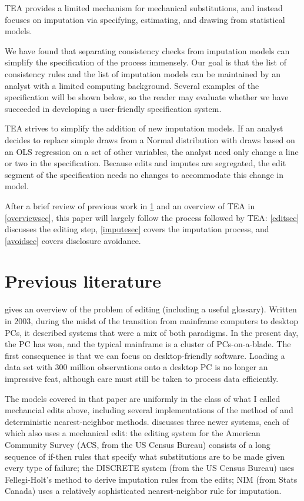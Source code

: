 \documentclass{article}
\begin{document}
TEA provides a limited mechanism for mechanical substitutions, and instead focuses on
imputation via specifying, estimating, and drawing from statistical models.

We have found that separating consistency checks from imputation models can simplify
the specification of the process immensely. Our goal is that the list of consistency
rules and the list of imputation models can be maintained by an analyst with a limited
computing background. Several examples of the specification will be shown below,
so the reader may evaluate whether we have succeeded in developing a user-friendly
specification system.

TEA strives to simplify the addition of new imputation models. If an analyst decides to
replace simple draws from a Normal distribution with draws based on an OLS regression on a
set of other variables, the analyst need only change a line or two in the specification.
Because edits and imputes are segregated, the edit segment of the specification needs no
changes to accommodate this change in model.


After a brief review of previous work in \ref{litsec} and an overview of TEA
in \ref{overviewsec}, this paper will largely follow the process followed by TEA:
\ref{editsec} discusses the editing step, \ref{imputesec} covers the imputation process,
and \ref{avoidsec} covers disclosure avoidance.

\section{Previous literature}\label{litsec}

\citet{edit:review} gives an overview of the problem of editing (including a useful
glossary). Written in 2003, during the midst of the transition from mainframe computers to
desktop PCs, it described systems that were a mix of both paradigms. In the present day, the PC
has won, and the typical mainframe is a cluster of PCs-on-a-blade. The first consequence
is that we can focus on desktop-friendly software. Loading a data set with 300 million observations
onto a desktop PC is no longer an impressive feat, although care must still be
taken to process data efficiently. 


The models covered in that paper are uniformly in the class of what I called mechancial
edits above, including several implementations of the method of \citet{fellegi:holt}
and deterministic nearest-neighbor methods.  \citet{chen:threesystems} discusses three
newer systems, each of which also uses a mechanical edit: the editing system for the
American Community Survey (ACS, from the US Census Bureau) consists of a long sequence
of if-then rules that specify what substitutions are to be made given every type of
failure; the DISCRETE system (from the US Census Bureau) uses Fellegi-Holt's method to
derive imputation rules from the edits; NIM (from Stats Canada) uses a relatively
sophisticated nearest-neighbor rule for imputation.
\end{document}
